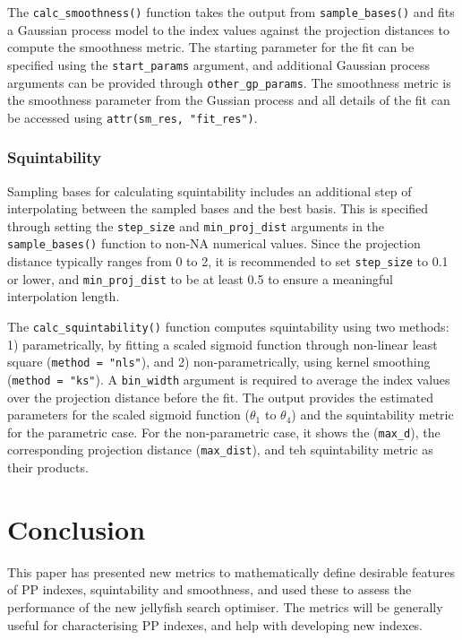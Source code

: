 \documentclass[
  12pt,
]{interact}
\theoremstyle{plain}
\begin{document}
The \texttt{calc\_smoothness()} function takes the output from
\texttt{sample\_bases()} and fits a Gaussian process model to the index
values against the projection distances to compute the smoothness
metric. The starting parameter for the fit can be specified using the
\texttt{start\_params} argument, and additional Gaussian process
arguments can be provided through \texttt{other\_gp\_params}. The
smoothness metric is the smoothness parameter from the Gussian process
and all details of the fit can be accessed using
\texttt{attr(sm\_res,\ "fit\_res")}.

\subsubsection{Squintability}\label{squintability}

Sampling bases for calculating squintability includes an additional step
of interpolating between the sampled bases and the best basis. This is
specified through setting the \texttt{step\_size} and
\texttt{min\_proj\_dist} arguments in the \texttt{sample\_bases()}
function to non-NA numerical values. Since the projection distance
typically ranges from 0 to 2, it is recommended to set
\texttt{step\_size} to 0.1 or lower, and \texttt{min\_proj\_dist} to be
at least 0.5 to ensure a meaningful interpolation length.

The \texttt{calc\_squintability()} function computes squintability using
two methods: 1) parametrically, by fitting a scaled sigmoid function
through non-linear least square (\texttt{method\ =\ "nls"}), and 2)
non-parametrically, using kernel smoothing (\texttt{method\ =\ "ks"}). A
\texttt{bin\_width} argument is required to average the index values
over the projection distance before the fit. The output provides the
estimated parameters for the scaled sigmoid function (\(\theta_1\) to
\(\theta_4\)) and the squintability metric for the parametric case. For
the non-parametric case, it shows the (\texttt{max\_d}), the
corresponding projection distance (\texttt{max\_dist}), and teh
squintability metric as their products.

\section{Conclusion}\label{sec-conclusion}

This paper has presented new metrics to mathematically define desirable
features of PP indexes, squintability and smoothness, and used these to
assess the performance of the new jellyfish search optimiser. The
metrics will be generally useful for characterising PP indexes, and help
with developing new indexes.
\end{document}
